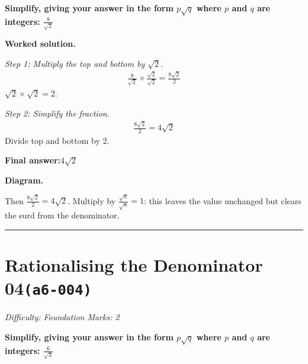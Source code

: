 \documentclass[11pt]{article}
\newcommand{\question}[1]{\par\medskip\noindent\textbf{#1}\par}
\begin{document}
\question{Simplify, giving your answer in the form \( p\sqrt{q} \) where \( p \) and \( q \) are integers: \( \frac{8}{\sqrt{2}} \)}

\textbf{Worked solution.}

\textit{Step 1: Multiply the top and bottom by \( \sqrt{2} \).}
\[\begin{gathered}
\frac{8}{\sqrt{2}} \times \frac{\sqrt{2}}{\sqrt{2}} = \frac{8\sqrt{2}}{2}
\end{gathered}\]
\( \sqrt{2} \times \sqrt{2} = 2 \).

\textit{Step 2: Simplify the fraction.}
\[\begin{gathered}
\frac{8\sqrt{2}}{2} = 4\sqrt{2}
\end{gathered}\]
Divide top and bottom by 2.

\begin{answerbox}
\textbf{Final answer:}\quad \(\displaystyle 4\sqrt{2}\)
\end{answerbox}
\textbf{Diagram.}

\begin{center}
\end{center}
\small Then $\frac{8\sqrt2}{2}=4\sqrt2$. Multiply by $\frac{\sqrt{a}}{\sqrt{a}}=1$: this leaves the value unchanged but clears the surd from the denominator.\normalsize

\medskip\hrule

\section*{Rationalising the Denominator 04\quad\small\texttt{(a6-004)}}
\textit{Difficulty: Foundation \quad\textbar\quad Marks: 2}

\question{Simplify, giving your answer in the form \( p\sqrt{q} \) where \( p \) and \( q \) are integers: \( \frac{6}{\sqrt{3}} \)}
\end{document}

